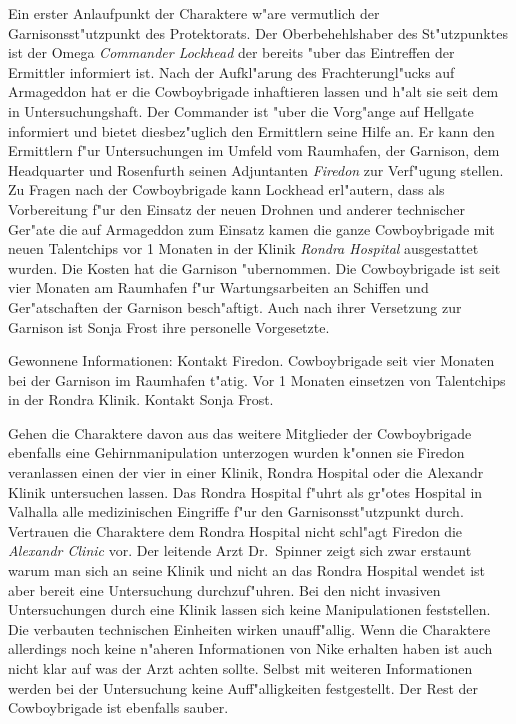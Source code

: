 
Ein erster Anlaufpunkt der Charaktere w"are vermutlich der Garnisonsst"utzpunkt des Protektorats. Der Oberbehehlshaber des St"utzpunktes ist der Omega \emph{Commander Lockhead} der bereits "uber das Eintreffen der Ermittler informiert ist. Nach der Aufkl"arung des Frachterungl"ucks auf Armageddon hat er die Cowboybrigade inhaftieren lassen und h"alt sie seit dem in Untersuchungshaft. Der Commander ist "uber die Vorg"ange auf Hellgate informiert und bietet diesbez"uglich den Ermittlern seine Hilfe an. Er kann den Ermittlern f"ur Untersuchungen im Umfeld vom Raumhafen, der Garnison, dem Headquarter und Rosenfurth seinen Adjuntanten \emph{Firedon} zur Verf"ugung stellen. Zu Fragen nach der Cowboybrigade kann Lockhead erl"autern, dass als Vorbereitung f"ur den Einsatz der neuen Drohnen und anderer technischer Ger"ate die auf Armageddon zum Einsatz kamen die ganze Cowboybrigade mit neuen Talentchips vor 1 Monaten in der Klinik \emph{Rondra Hospital} ausgestattet wurden. Die Kosten hat die Garnison "ubernommen. Die Cowboybrigade ist seit vier Monaten am Raumhafen f"ur Wartungsarbeiten an Schiffen und Ger"atschaften der Garnison besch"aftigt. Auch nach ihrer Versetzung zur Garnison ist Sonja Frost ihre personelle Vorgesetzte.

\begin{remarks}
	Gewonnene Informationen: Kontakt Firedon. Cowboybrigade seit vier Monaten bei der Garnison im Raumhafen t"atig. Vor 1 Monaten einsetzen von Talentchips in der Rondra Klinik. Kontakt Sonja Frost.
\end{remarks}




Gehen die Charaktere davon aus das weitere Mitglieder der Cowboybrigade ebenfalls eine Gehirnmanipulation unterzogen wurden k"onnen sie Firedon veranlassen einen der vier in einer Klinik, Rondra Hospital oder die Alexandr Klinik untersuchen lassen. Das Rondra Hospital f"uhrt als gr"o\3tes Hospital in Valhalla alle medizinischen Eingriffe f"ur den Garnisonsst"utzpunkt durch. Vertrauen die Charaktere dem Rondra Hospital nicht schl"agt Firedon die \emph{Alexandr Clinic} vor. Der leitende Arzt Dr.~Spinner zeigt sich zwar erstaunt warum man sich an seine Klinik und nicht an das Rondra Hospital wendet ist aber bereit eine Untersuchung durchzuf"uhren. Bei den nicht invasiven Untersuchungen durch eine Klinik lassen sich keine Manipulationen feststellen. Die verbauten technischen Einheiten wirken unauff"allig. Wenn die Charaktere allerdings noch keine n"aheren Informationen von Nike erhalten haben ist auch nicht klar auf was der Arzt achten sollte. Selbst mit weiteren Informationen werden bei der Untersuchung keine Auff"alligkeiten festgestellt. Der Rest der Cowboybrigade ist ebenfalls sauber.

